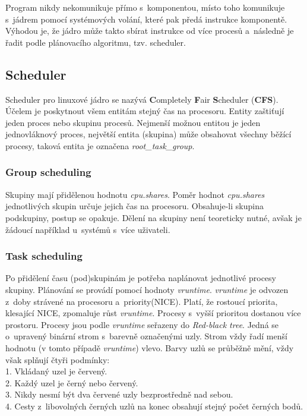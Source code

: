 \documentclass[12pt,a4paper,twoside,]{article}
\begin{document}
{{{{{{{Program nikdy nekomunikuje přímo s~komponentou, místo toho komunikuje s~jádrem pomocí systémových volání, které pak předá instrukce komponentě. Výhodou je, že jádro může takto sbírat instrukce od více procesů a~následně je řadit podle plánovacího algoritmu, tzv. scheduler.

\subsection{\textsf{Scheduler}}
Scheduler pro linuxové jádro se nazývá {\bf C}ompletely {\bf F}air {\bf S}cheduler ({\bf CFS}). Účelem je poskytnout všem entitám stejný čas na procesoru. Entity zaštiťují jeden proces nebo skupinu procesů. Nejmenší možnou entitou je jeden jednovláknový proces, největší entita (skupina) může obsahovat všechny běžící procesy, taková entita je označena \textit{root\_task\_group}. 
\subsubsection{\textsf{Group scheduling}}
Skupiny mají přidělenou hodnotu \textit{cpu.shares}. Poměr hodnot \textit{cpu.shares} jednotlivých skupin určuje jejich čas na procesoru. Obsahuje-li skupina podskupiny, postup se opakuje. Dělení na skupiny není teoreticky nutné, avšak je žádoucí například u~systémů s~více uživateli.

\subsubsection{\textsf{Task scheduling}}
Po přidělení času (pod)skupinám je potřeba naplánovat jednotlivé procesy skupiny. Plánování se provádí pomocí hodnoty \textit{vruntime}. \textit{vruntime} je odvozen z~doby strávené na procesoru a~priority(NICE). Platí, že rostoucí priorita, klesající NICE, zpomaluje růst \textit{vruntime}. Procesy s~vyšší prioritou dostanou více prostoru. Procesy jsou podle \textit{vruntime} seřazeny do \textit{Red-black tree}. Jedná se o~upravený binární strom s~barevně označenými uzly. Strom vždy řadí menší hodnotu (v tomto případě \textit{vruntime}) vlevo. Barvy uzlů se průběžně mění, vždy však splňují čtyři podmínky:\\
1. Vkládaný uzel je červený.\\2. Každý uzel je černý nebo červený.\\3. Nikdy nesmí být dva červené uzly bezprostředně nad sebou.\\4. Cesty z~libovolných černých uzlů na konec obsahují stejný počet černých bodů. \\ 

}}}}}}}
\end{document}
